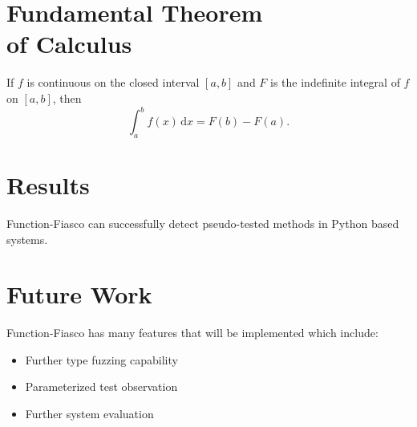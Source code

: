 \documentclass[a0paper,fleqn]{betterposter}
\begin{document}
{\section{Fundamental Theorem\\of Calculus}
If $f$ is continuous on the closed interval $[a,b]$ and $F$ is the indefinite integral of $f$ on $[a,b]$, then
\begin{equation}
\int_a^b f(x)\,\mathrm{d}x = F(b)-F(a).
\end{equation}


\vfill

}{
\section{Results}


Function-Fiasco can successfully detect pseudo-tested methods in Python based systems.

\section{Future Work}
Function-Fiasco has many features that will be implemented which include:
\begin{itemize}
  \item{Further type fuzzing capability}
  \item{Parameterized test observation}
  \item{Further system evaluation}
\end{itemize}


}
\end{document}

